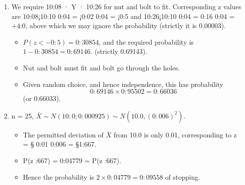 \documentclass[a4paper,12pt]{article}
\begin{document}
\begin{enumerate}
\begin{eqnarray}
i.e. &=& P(z > \frac{-0:24}{0:12} ) \\
&=& P(z > ¡2:0) \\ 
&=& 0:97725.
\end{eqnarray}
(a) Plates are independent, so required probability is (0:97725)2 = 0:95502.
\item We require 10:08 · Y · 10:26 for nut and bolt to fit. Corresponding z values
are 10:08¡10:10
0:04 = ¡0:02
0:04 = ¡0:5 and 10:26¡10:10
0:04 = 0:16
0:04 = +4:0, above which we
may ignore the probability (strictly it is 0.00003). 
\begin{itemize}
\item $P(z < -0:5) = 0:30854$,
and the required probability is $1 - 0:30854 = 0:69146.$ (strictly 0.69143).
\item Nut and bolt must fit and bolt go through the holes.
\item Given random choice,
and hence independence, this has probability \[0:69146 \times 0:95502 = 0:66036\]
(or 0.66033).
\end{itemize}
\item n = 25, $\bar{X} \sim N(10:0; 0:0009
25 ) \sim N(10.0, (0:006)^2)$.
\begin{itemize}
\item The permitted deviation of $\bar{X}$ from 10.0 is only 0.01, corresponding to
z = § 0:01
0:006 = §1:667.
\item P(z :667) = 0:04779 = P(z :667).
\item Hence the probability is $2 \times 0:04779 = 0:09558$ of stopping.
\end{itemize}
\end{enumerate}
\end{document}
